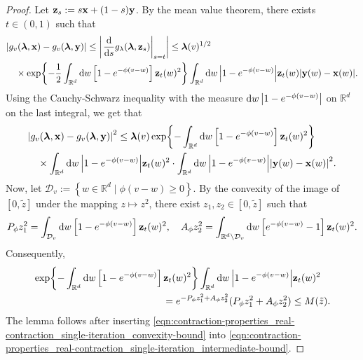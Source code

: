 \documentclass[11pt]{article}
\newcommand{\R}{\mathbb R}
\newcommand{\bl}{\bm{\lambda}}
\newcommand{\bx}{\vb{x}}
\newcommand{\by}{\vb{y}}
\newcommand{\bz}{\vb{z}}
\newcommand{\aconst}{A_{\phi}}
\newcommand{\pconst}{P_{\phi}}
\newcommand{\set}[1]{\left\{#1\right\}}
\numberwithin{equation}{section}
\theoremstyle{plain}
\theoremstyle{definition}
\theoremstyle{remark}
\begin{document}
\begin{proof}
Let $\bz_{s}:=s\bx+(1-s)\by$.
By the mean value theorem, there exists $t\in(0,1)$ such that
\begin{equation}
\begin{multlined}
\abs{g_{v}(\bl,\bx)-g_{v}(\bl,\by)}
\le\abs{\eval{\dv{s}g_{\lambda}(\bl,\bz_{s})}_{s=t}}
\le\bl(v)^{1/2}
\\
\times\exp{-\frac{1}{2}\int_{\R^{d}}\dd{w}\left[1-e^{-\phi(v-w)}\right]\bz_{t}(w)^{2}}
\int_{\R^{d}}\dd{w}\abs{1-e^{-\phi(v-w)}}\bz_{t}(w)\abs{\by(w)-\bx(w)}.
\end{multlined}
\end{equation}
Using the Cauchy-Schwarz inequality with the measure $\dd{w}\abs{1-e^{-\phi(v-w)}}$ on $\R^{d}$ on the last integral, we get that
\begin{equation}
\label{eqn:contraction-properties_real-contraction_single-iteration_intermediate-bound}
\begin{multlined}
\abs{g_{v}(\bl,\bx)-g_{v}(\bl,\by)}^{2}
\le \bl(v)\exp{-\int_{\R^{d}}\dd{w}\left[1-e^{-\phi(v-w)}\right]\bz_{t}(w)^{2}}
\\
\times \int_{\R^{d}}\dd{w}\abs{1-e^{-\phi(v-w)}}\bz_{t}(w)^{2}
\cdot\int_{\R^{d}}\dd{w}\abs{1-e^{-\phi(v-w)}}\abs{\by(w)-\bx(w)}^{2}.
\end{multlined}
\end{equation}
Now, let $\mathcal{D}_{v}:=\set{w\in\R^{d}\mid\phi(v-w)\ge 0}$.
By the convexity of the image of $[0,\tilde{z}]$ under the mapping $z\mapsto z^{2}$, there exist $z_{1},z_{2}\in[0,\tilde{z}]$ such that
\begin{equation}
\label{eqn:contraction-properties_real-contraction_single-iteration_convexity}
\pconst z_{1}^{2}=\int_{\mathcal{D}_{v}}\dd{w}\left[1-e^{-\phi(v-w)}\right]\bz_{t}(w)^{2}, \quad
\aconst z_{2}^{2}=\int_{\R^{d}\setminus\mathcal{D}_{v}}\dd{w}\left[e^{-\phi(v-w)}-1\right]\bz_{t}(w)^{2}.
\end{equation}
Consequently, 
\begin{equation}
\label{eqn:contraction-properties_real-contraction_single-iteration_convexity-bound}
\begin{multlined}
\exp{-\int_{\R^{d}}\dd{w}\left[1-e^{-\phi(v-w)}\right]\bz_{t}(w)^{2}}
\int_{\R^{d}}\dd{w}\abs{1-e^{-\phi(v-w)}}\bz_{t}(w)^{2}
\\
=e^{-\pconst z_{1}^{2}+\aconst z_{2}^{2}}(\pconst z_{1}^{2}+\aconst z_{2}^{2})
\le M(\tilde{z}).
\end{multlined}
\end{equation}
The lemma follows after inserting \eqref{eqn:contraction-properties_real-contraction_single-iteration_convexity-bound} into \eqref{eqn:contraction-properties_real-contraction_single-iteration_intermediate-bound}.
\end{proof}
\end{document}
